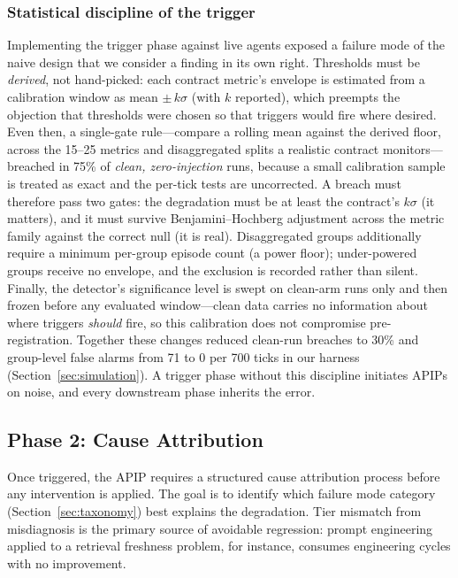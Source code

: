 \documentclass[conference]{IEEEtran}
\newcommand{\cleanFalseBreachBefore}{75\%}       %
\newcommand{\cleanFalseBreachAfter}{30\%}        %
\newcommand{\groupFalseAlarmsBefore}{71}         %
\newcommand{\groupFalseAlarmsAfter}{0}           %
\begin{document}
\subsubsection{Statistical discipline of the trigger}
\label{subsubsec:trigger-stats}

Implementing the trigger phase against live agents exposed a failure mode of
the naive design that we consider a finding in its own right. Thresholds must
be \emph{derived}, not hand-picked: each contract metric's envelope is
estimated from a calibration window as mean $\pm\, k\sigma$ (with $k$
reported), which preempts the objection that thresholds were chosen so that
triggers would fire where desired. Even then, a single-gate rule---compare a
rolling mean against the derived floor, across the 15--25 metrics and
disaggregated splits a realistic contract monitors---breached in
\cleanFalseBreachBefore{} of \emph{clean, zero-injection} runs, because a
small calibration sample is treated as exact and the per-tick tests are
uncorrected. A breach must therefore pass two gates: the degradation must be
at least the contract's $k\sigma$ (it matters), and it must survive
Benjamini--Hochberg adjustment across the metric family against the correct
null (it is real). Disaggregated groups additionally require a minimum
per-group episode count (a power floor); under-powered groups receive no
envelope, and the exclusion is recorded rather than silent. Finally, the
detector's significance level is swept on clean-arm runs only and then
frozen before any evaluated window---clean data carries no information about
where triggers \emph{should} fire, so this calibration does not compromise
pre-registration. Together these changes reduced clean-run breaches to
\cleanFalseBreachAfter{} and group-level false alarms from
\groupFalseAlarmsBefore{} to \groupFalseAlarmsAfter{} per 700 ticks in our
harness (Section~\ref{sec:simulation}). A trigger phase without this
discipline initiates APIPs on noise, and every downstream phase inherits the
error.

\subsection{Phase 2: Cause Attribution}
\label{subsec:cause-attribution}

Once triggered, the APIP requires a structured cause attribution process before
any intervention is applied. The goal is to identify which failure mode
category (Section~\ref{sec:taxonomy}) best explains the degradation. Tier
mismatch from misdiagnosis is the primary source of avoidable regression: prompt
engineering applied to a retrieval freshness problem, for instance, consumes
engineering cycles with no improvement.
\end{document}
